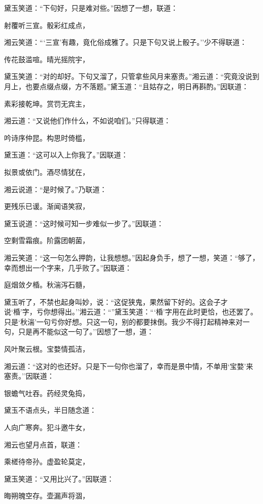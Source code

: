 黛玉笑道：``下句好，只是难对些。''因想了一想，联道：

射覆听三宣。骰彩红成点，

湘云笑道：```三宣'有趣，竟化俗成雅了。只是下句又说上骰子。''少不得联道：

传花鼓滥喧。晴光摇院宇，

黛玉笑道：``对的却好。下句又溜了，只管拿些风月来塞责。''湘云道：``究竟没说到月上，也要点缀点缀，方不落题。''黛玉道：``且姑存之，明日再斟酌。''因联道：

素彩接乾坤。赏罚无宾主，

湘云道：``又说他们作什么，不如说咱们。''只得联道：

吟诗序仲昆。构思时倚槛，

黛玉道：``这可以入上你我了。''因联道：

拟景或依门。酒尽情犹在，

湘云说道：``是时候了。''乃联道：

更残乐已谖。渐闻语笑寂，

黛玉说道：``这时候可知一步难似一步了。''因联道：

空剩雪霜痕。阶露团朝菌，

湘云笑道：``这一句怎么押韵，让我想想。''因起身负手，想了一想，笑道：``够了，幸而想出一个字来，几乎败了。''因联道：

庭烟敛夕棔。秋湍泻石髓，

黛玉听了，不禁也起身叫妙，说：``这促狭鬼，果然留下好的。这会子才说`棔'字，亏你想得出。''湘云道：``''黛玉笑道：```棔'字用在此时更恰，也还罢了。只是`秋湍'一句亏你好想。只这一句，别的都要抹倒。我少不得打起精神来对一句，只是再不能似这一句了。''因想了一想，道：

风叶聚云根。宝婺情孤洁，

湘云道：``这对的也还好。只是下一句你也溜了，幸而是景中情，不单用`宝婺'来塞责。''因联道：

银蟾气吐吞。药经灵兔捣，

黛玉不语点头，半日随念道：

人向广寒奔。犯斗邀牛女，

湘云也望月点首，联道：

乘槎待帝孙。虚盈轮莫定，

黛玉笑道：``又用比兴了。''因联道：

晦朔魄空存。壶漏声将涸，

